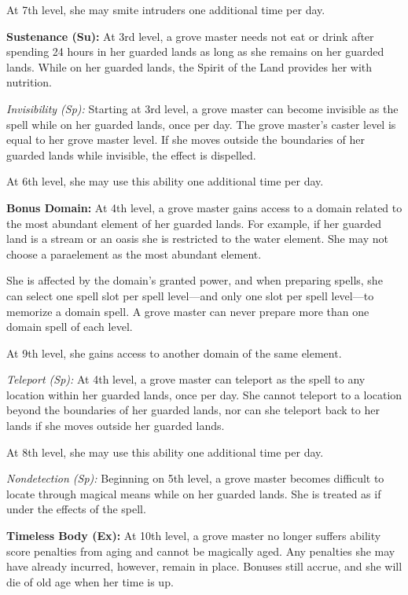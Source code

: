 {At 7th level, she may smite intruders one additional time per day.

\textbf{Sustenance (Su):} At 3rd level, a grove master needs not eat or drink after spending 24 hours in her guarded lands as long as she remains on her guarded lands. While on her guarded lands, the Spirit of the Land provides her with nutrition. 

\textit{Invisibility (Sp):} Starting at 3rd level, a grove master can become invisible as the  spell while on her guarded lands, once per day. The grove master's caster level is equal to her grove master level. If she moves outside the boundaries of her guarded lands while invisible, the effect is dispelled.

At 6th level, she may use this ability one additional time per day.

\textbf{Bonus Domain:} At 4th level, a grove master gains access to a domain related to the most abundant element of her guarded lands. For example, if her guarded land is a stream or an oasis she is restricted to the water element. She may not choose a paraelement as the most abundant element.

She is affected by the domain's granted power, and when preparing spells, she can select one spell slot per spell level---and only one slot per spell level---to memorize a domain spell. A grove master can never prepare more than one domain spell of each level.

At 9th level, she gains access to another domain of the same element.

\textit{Teleport (Sp):} At 4th level, a grove master can teleport as the  spell to any location within her guarded lands, once per day. She cannot teleport to a location beyond the boundaries of her guarded lands, nor can she teleport back to her lands if she moves outside her guarded lands.

At 8th level, she may use this ability one additional time per day.

\textit{Nondetection (Sp):} Beginning on 5th level, a grove master becomes difficult to locate through magical means while on her guarded lands. She is treated as if under the effects of the  spell.

\textbf{Timeless Body (Ex):} At 10th level, a grove master no longer suffers ability score penalties from aging and cannot be magically aged. Any penalties she may have already incurred, however, remain in place. Bonuses still accrue, and she will die of old age when her time is up.
}

